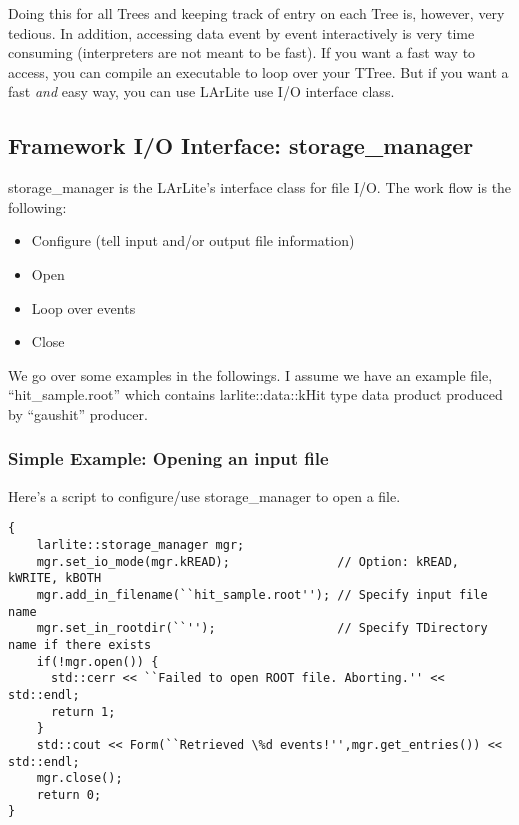 Doing this for all Trees and keeping track of entry on each Tree is, however, very tedious.
In addition, accessing data event by event interactively is very time consuming (interpreters are not meant to be fast).
If you want a fast way to access, you can compile an executable to loop over your TTree.
But if you want a fast {\it and} easy way, you can use LArLite use I/O interface class.

\subsection{Framework I/O Interface: {\ttfamily storage\_manager}}

{\ttfamily storage\_manager} is the LArLite's \CPP interface class for \ROOT file I/O.
The work flow is the following:
\begin{itemize}
\item Configure (tell input and/or output file information)
\item Open
\item Loop over events
\item Close
\end{itemize}

We go over some examples in the followings. I assume we have an example file, ``hit\_sample.root''
which contains {\ttfamily larlite::data::kHit} type data product produced by ``gaushit'' producer.

\subsubsection{Simple Example: Opening an input file}
Here's a \CINT script to configure/use {\ttfamily storage\_manager} to open a \ROOT file.
\begin{lstlisting}
{
    larlite::storage_manager mgr;
    mgr.set_io_mode(mgr.kREAD);               // Option: kREAD, kWRITE, kBOTH
    mgr.add_in_filename(``hit_sample.root''); // Specify input file name
    mgr.set_in_rootdir(``'');                 // Specify TDirectory name if there exists
    if(!mgr.open()) {
      std::cerr << ``Failed to open ROOT file. Aborting.'' << std::endl;
      return 1;
    }
    std::cout << Form(``Retrieved \%d events!'',mgr.get_entries()) << std::endl;
    mgr.close();
    return 0;
}
\end{lstlisting}


